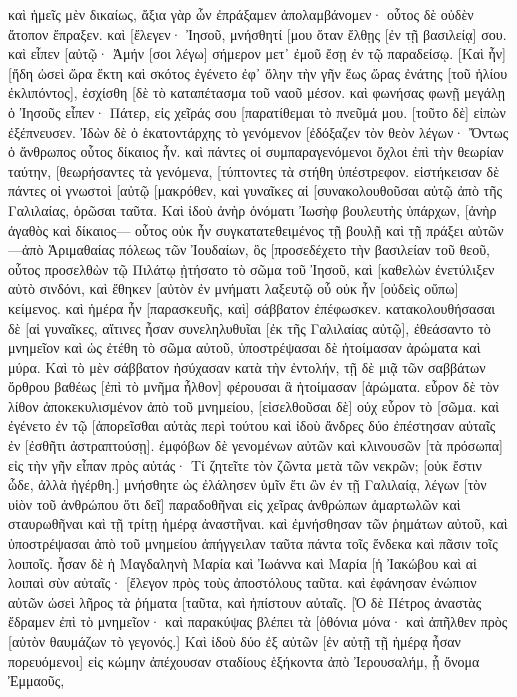 καὶ ἡμεῖς μὲν δικαίως, ἄξια γὰρ ὧν ἐπράξαμεν ἀπολαμβάνομεν· οὗτος δὲ οὐδὲν ἄτοπον ἔπραξεν. 
καὶ [ἔλεγεν· Ἰησοῦ, μνήσθητί [μου ὅταν ἔλθῃς [ἐν τῇ βασιλείᾳ] σου. 
καὶ εἶπεν [αὐτῷ· Ἀμήν [σοι λέγω] σήμερον μετ᾽ ἐμοῦ ἔσῃ ἐν τῷ παραδείσῳ. 
[Καὶ ἦν] [ἤδη ὡσεὶ ὥρα ἕκτη καὶ σκότος ἐγένετο ἐφ᾽ ὅλην τὴν γῆν ἕως ὥρας ἐνάτης 
[τοῦ ἡλίου ἐκλιπόντος], ἐσχίσθη [δὲ τὸ καταπέτασμα τοῦ ναοῦ μέσον. 
καὶ φωνήσας φωνῇ μεγάλῃ ὁ Ἰησοῦς εἶπεν· Πάτερ, εἰς χεῖράς σου [παρατίθεμαι τὸ πνεῦμά μου. [τοῦτο δὲ] εἰπὼν ἐξέπνευσεν. 
Ἰδὼν δὲ ὁ ἑκατοντάρχης τὸ γενόμενον [ἐδόξαζεν τὸν θεὸν λέγων· Ὄντως ὁ ἄνθρωπος οὗτος δίκαιος ἦν. 
καὶ πάντες οἱ συμπαραγενόμενοι ὄχλοι ἐπὶ τὴν θεωρίαν ταύτην, [θεωρήσαντες τὰ γενόμενα, [τύπτοντες τὰ στήθη ὑπέστρεφον. 
εἱστήκεισαν δὲ πάντες οἱ γνωστοὶ [αὐτῷ [μακρόθεν, καὶ γυναῖκες αἱ [συνακολουθοῦσαι αὐτῷ ἀπὸ τῆς Γαλιλαίας, ὁρῶσαι ταῦτα. 
Καὶ ἰδοὺ ἀνὴρ ὀνόματι Ἰωσὴφ βουλευτὴς ὑπάρχων, [ἀνὴρ ἀγαθὸς καὶ δίκαιος— 
οὗτος οὐκ ἦν συγκατατεθειμένος τῇ βουλῇ καὶ τῇ πράξει αὐτῶν—ἀπὸ Ἁριμαθαίας πόλεως τῶν Ἰουδαίων, ὃς [προσεδέχετο τὴν βασιλείαν τοῦ θεοῦ, 
οὗτος προσελθὼν τῷ Πιλάτῳ ᾐτήσατο τὸ σῶμα τοῦ Ἰησοῦ, 
καὶ [καθελὼν ἐνετύλιξεν αὐτὸ σινδόνι, καὶ ἔθηκεν [αὐτὸν ἐν μνήματι λαξευτῷ οὗ οὐκ ἦν [οὐδεὶς οὔπω] κείμενος. 
καὶ ἡμέρα ἦν [παρασκευῆς, καὶ] σάββατον ἐπέφωσκεν. 
κατακολουθήσασαι δὲ [αἱ γυναῖκες, αἵτινες ἦσαν συνεληλυθυῖαι [ἐκ τῆς Γαλιλαίας αὐτῷ], ἐθεάσαντο τὸ μνημεῖον καὶ ὡς ἐτέθη τὸ σῶμα αὐτοῦ, 
ὑποστρέψασαι δὲ ἡτοίμασαν ἀρώματα καὶ μύρα. Καὶ τὸ μὲν σάββατον ἡσύχασαν κατὰ τὴν ἐντολήν, 
τῇ δὲ μιᾷ τῶν σαββάτων ὄρθρου βαθέως [ἐπὶ τὸ μνῆμα ἦλθον] φέρουσαι ἃ ἡτοίμασαν [ἀρώματα. 
εὗρον δὲ τὸν λίθον ἀποκεκυλισμένον ἀπὸ τοῦ μνημείου, 
[εἰσελθοῦσαι δὲ] οὐχ εὗρον τὸ [σῶμα. 
καὶ ἐγένετο ἐν τῷ [ἀπορεῖσθαι αὐτὰς περὶ τούτου καὶ ἰδοὺ ἄνδρες δύο ἐπέστησαν αὐταῖς ἐν [ἐσθῆτι ἀστραπτούσῃ]. 
ἐμφόβων δὲ γενομένων αὐτῶν καὶ κλινουσῶν [τὰ πρόσωπα] εἰς τὴν γῆν εἶπαν πρὸς αὐτάς· Τί ζητεῖτε τὸν ζῶντα μετὰ τῶν νεκρῶν; 
[οὐκ ἔστιν ὧδε, ἀλλὰ ἠγέρθη.] μνήσθητε ὡς ἐλάλησεν ὑμῖν ἔτι ὢν ἐν τῇ Γαλιλαίᾳ, 
λέγων [τὸν υἱὸν τοῦ ἀνθρώπου ὅτι δεῖ] παραδοθῆναι εἰς χεῖρας ἀνθρώπων ἁμαρτωλῶν καὶ σταυρωθῆναι καὶ τῇ τρίτῃ ἡμέρᾳ ἀναστῆναι. 
καὶ ἐμνήσθησαν τῶν ῥημάτων αὐτοῦ, 
καὶ ὑποστρέψασαι ἀπὸ τοῦ μνημείου ἀπήγγειλαν ταῦτα πάντα τοῖς ἕνδεκα καὶ πᾶσιν τοῖς λοιποῖς. 
ἦσαν δὲ ἡ Μαγδαληνὴ Μαρία καὶ Ἰωάννα καὶ Μαρία [ἡ Ἰακώβου καὶ αἱ λοιπαὶ σὺν αὐταῖς· [ἔλεγον πρὸς τοὺς ἀποστόλους ταῦτα. 
καὶ ἐφάνησαν ἐνώπιον αὐτῶν ὡσεὶ λῆρος τὰ ῥήματα [ταῦτα, καὶ ἠπίστουν αὐταῖς. 
[Ὁ δὲ Πέτρος ἀναστὰς ἔδραμεν ἐπὶ τὸ μνημεῖον· καὶ παρακύψας βλέπει τὰ [ὀθόνια μόνα· καὶ ἀπῆλθεν πρὸς [αὑτὸν θαυμάζων τὸ γεγονός.] 
Καὶ ἰδοὺ δύο ἐξ αὐτῶν [ἐν αὐτῇ τῇ ἡμέρᾳ ἦσαν πορευόμενοι] εἰς κώμην ἀπέχουσαν σταδίους ἑξήκοντα ἀπὸ Ἰερουσαλήμ, ᾗ ὄνομα Ἐμμαοῦς, 
